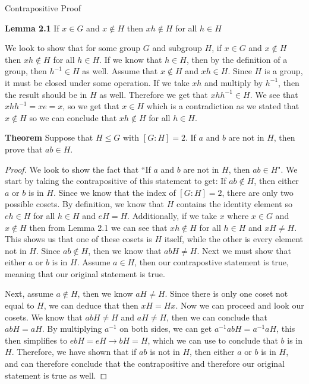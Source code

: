 Contrapositive Proof

\textbf{Lemma 2.1} If $x \in G$ and $x \not \in H$ then $xh \not \in H$ for all $h \in H$

We look to show that for some group $G$ and subgroup $H$, if $x \in G$ and $x \not \in H$ then $xh \not \in H$ for all $h \in H$.
If we know that $h\in H$, then by the definition of a group, then $h^{-1} \in H$ as well. Assume that $x \not \in H$ and $xh \in H$. Since $H$ is a group, it must be closed under some operation. If we take $xh$ and multiply by $h^{-1}$, then the result should be in $H$ as well. Therefore we get that $xhh^{-1} \in H$. We see that $xhh^{-1} = xe = x$, so we get that $x\in H$ which is a contradiction as we stated that $x \not \in H$ so we can conclude that $xh \not \in H$ for all $h \in H$.



\textbf{Theorem}
Suppose that $H\leq G$ with $[G:H]=2$.  If $a$ and $b$ are not in $H$, then prove that $ab\in H$.



\begin{proof}
We look to show the fact that ``If $a$ and $b$ are not in $H$, then $ab\in H$". We start by taking the contrapositive of this statement to get: If $ab \not\in H$, then either $a$ or $b$ is in $H$. Since we know that the index of $[G:H] = 2$, there are only two possible cosets. By definition, we know that $H$ contains the identity element so $eh \in H$ for all $h\in H$ and $eH = H$. Additionally, if we take $x$ where $x\in G$ and $x \not\in H$ then from Lemma 2.1 we can see that $xh \not \in H $  for all $h\in H$ and $xH \neq H$. This shows us that one of these cosets is $H$ itself, while the other is every element not in $H$. Since $ab\not\in H$, then we know that $abH \neq H$. Next we must show that either $a$ or $b$ is in $H$. Assume $a \in H$, then our contrapostive statement is true, meaning that our original statement is true. 

Next, assume $a \not\in H$, then we know $aH \neq H$.  Since there is only one coset not equal to $H$, we can deduce that then $xH = Hx$. Now we can proceed and look our cosets. We know that $abH \neq H$ and $aH \neq H$, then we can conclude that $abH = aH$. By multiplying $a^{-1}$ on both sides, we can get $a^{-1}abH = a^{-1}aH$, this then simplifies to $ebH = eH \rightarrow bH = H$, which we can use to conclude that $b$ is in $H$. Therefore, we have shown that if $ab$ is not in $H$, then either $a$ or $b$ is in $H$, and can therefore conclude that the contrapositive and therefore our original statement is true as well.
\end{proof}
